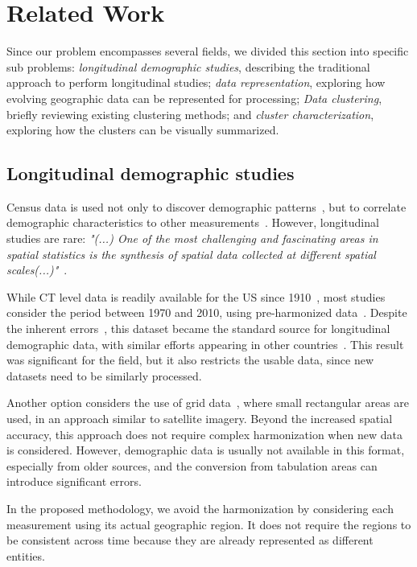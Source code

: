 \section{Related Work}

Since our problem encompasses several fields, we divided this section into
specific sub problems: \emph{longitudinal demographic studies}, describing the
traditional approach to perform longitudinal studies; \emph{data
representation}, exploring how evolving geographic data can be represented for
processing; \emph{Data clustering}, briefly reviewing existing clustering
methods; and \emph{cluster characterization}, exploring how the clusters can be
visually summarized.

\subsection{Longitudinal demographic studies}
Census data is used not only to discover demographic
patterns~\cite{Firebaugh2016}, but to correlate demographic characteristics to
other measurements~\cite{diez1997neighborhood}. However, longitudinal studies
are rare: \emph{"(...) One of the most challenging and fascinating areas in
spatial statistics is the synthesis of spatial data collected at different
spatial scales(...)"}~\cite{gotway2002combining}.

While CT level data is readily available for the US since 1910~\cite{nhgis},
most studies consider the period between 1970 and 2010, using pre-harmonized
data~\cite{Logan2014,nhgis}. Despite the inherent
errors~\cite{Logan2016,Hallisey2017}, this dataset became the standard source
for longitudinal demographic data, with similar efforts appearing in other
countries~\cite{Liu2015,Lee2015,Allen2018}. This result was significant for the
field, but it also restricts the usable data, since new datasets need to be
similarly processed.


Another option considers the use of grid data~\cite{Dmowska2017,Dmowska2018},
where small rectangular areas are used, in an approach similar to satellite
imagery. Beyond the increased spatial accuracy, this approach does not require
complex harmonization when new data is considered. However, demographic data is
usually not available in this format, especially from older sources, and the
conversion from tabulation areas can introduce significant errors.

In the proposed methodology, we avoid the harmonization by considering each
measurement using its actual geographic region. It does not require the regions
to be consistent across time because they are already represented as different
entities. 


